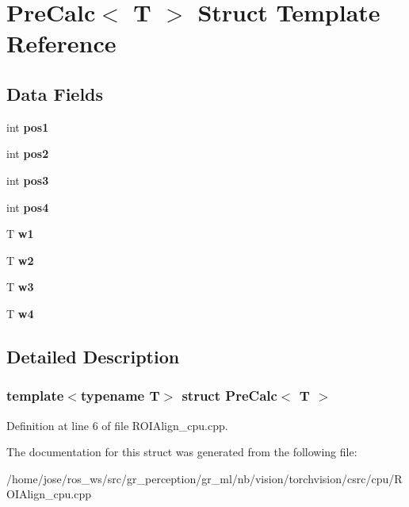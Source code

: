\hypertarget{structPreCalc}{}\section{Pre\+Calc$<$ T $>$ Struct Template Reference}
\label{structPreCalc}
\subsection*{Data Fields}
\begin{DoxyCompactItemize}
\item 
\mbox{\label{structPreCalc_abb6ba08b1e3785e55682dad006a2ce11}} 
int {\bfseries pos1}
\item 
\mbox{\label{structPreCalc_a5663589ace9df57059c8e24abe502e8c}} 
int {\bfseries pos2}
\item 
\mbox{\label{structPreCalc_a9b13f38e147c05ba2b1db0d9b7e976d8}} 
int {\bfseries pos3}
\item 
\mbox{\label{structPreCalc_ae100f2b0a2972ab0bdf3006cc25a5b20}} 
int {\bfseries pos4}
\item 
\mbox{\label{structPreCalc_ac7fd8e87b2e35ae8910b63d0b7e5d343}} 
T {\bfseries w1}
\item 
\mbox{\label{structPreCalc_a001c43e172dc9b156e1bb7b285f2302d}} 
T {\bfseries w2}
\item 
\mbox{\label{structPreCalc_aafffc28db5adcd9784bc90f0b47f6eeb}} 
T {\bfseries w3}
\item 
\mbox{\label{structPreCalc_ab19c3ca7559f70546cccf4aa38c4b99c}} 
T {\bfseries w4}
\end{DoxyCompactItemize}


\subsection{Detailed Description}
\subsubsection*{template$<$typename T$>$\newline
struct Pre\+Calc$<$ T $>$}



Definition at line 6 of file R\+O\+I\+Align\+\_\+cpu.\+cpp.



The documentation for this struct was generated from the following file\+:\begin{DoxyCompactItemize}
\item 
/home/jose/ros\+\_\+ws/src/gr\+\_\+perception/gr\+\_\+ml/nb/vision/torchvision/csrc/cpu/R\+O\+I\+Align\+\_\+cpu.\+cpp\end{DoxyCompactItemize}
